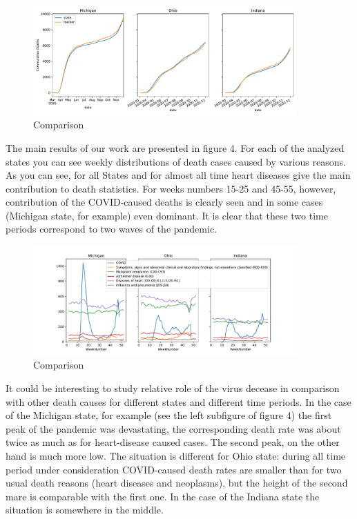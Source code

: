 \documentclass[conference]{IEEEtran}
\begin{document}
\begin{figure}
  \centering
  \includegraphics[width=0.9\textwidth]{figs/raw_tracker_comp_cum}
  \caption{Comparison}
  \label{fig:RT_comp_CUM}
\end{figure}

The main results of our work are presented in figure 4. For each of the analyzed states you can see weekly distributions of death cases caused by various reasons. As you can see, for all States and for almost all time heart diseases give the main contribution to death statistics. For weeks numbers 15-25 and 45-55, however, contribution of the COVID-caused deaths is clearly seen and in some cases (Michigan state, for example) even dominant. It is clear that these two time periods correspond to two waves of the pandemic.


\begin{figure}
  \centering
  \includegraphics[width=0.9\textwidth]{figs/weekly_deaths}
  \caption{Comparison}
  \label{fig:weekly_deaths}
\end{figure}

It could be interesting to study relative role of the virus decease in comparison with other death causes for different states and different time periods. In the case of the Michigan state, for example (see the left subfigure of figure 4) the first peak of the pandemic was devastating, the corresponding death rate was about twice as much as for heart-disease caused cases. The second peak, on the other hand is much more low. The situation is different for Ohio state: during all time period under consideration COVID-caused death rates are smaller than for two usual death reasons (heart diseases and neoplasms), but the height of the second mare is comparable with the first one. In the case of the Indiana state the situation is somewhere in the middle.
\end{document}
